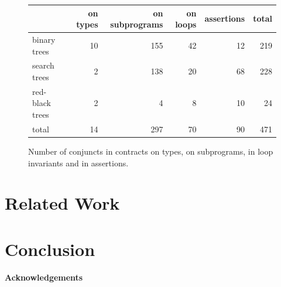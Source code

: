 \documentclass[11pt,a4paper]{article}
\begin{document}
\begin{figure}[ht]
\begin{center}
\begin{tabular}{l|rrrr|r}
                & on types & on subprograms & on loops & assertions & total \\ \hline
binary trees    & 10       & 155            & 42       & 12         & 219 \\
search trees    & 2        & 138            & 20       & 68         & 228 \\
red-black trees & 2        & 4              & 8        & 10         & 24 \\ \hline
total           & 14       & 297            & 70       & 90         & 471
\end{tabular}
\caption{\label{tab-sloc} Number of conjuncts in contracts on types, on subprograms, in loop invariants and in assertions.}
\end{center}
\end{figure}


\section{Related Work}
\label{related-work}

\section{Conclusion}


\paragraph*{Acknowledgements}




\end{document}
